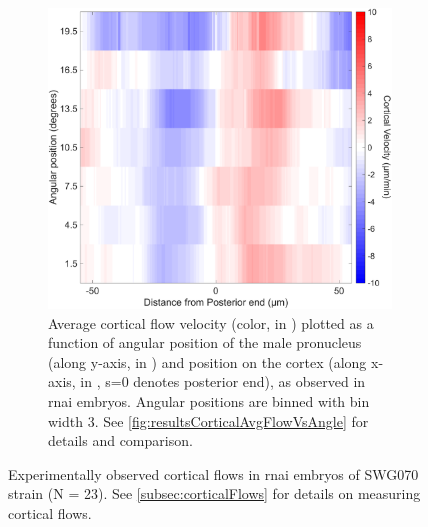 \begin{figure}
\begin{subfigure}[t]{0.3\textwidth}
    \includegraphics[width=\textwidth]{Results/FigExpAir1/crtxFlowAngle.pdf}
    \caption{Average cortical flow velocity (color, in \si{\unitCrtxVel}) plotted as a function of angular position of the male pronucleus (along y-axis, in \si{\unitAngle}) and position on the cortex (along x-axis, in \si{\unitLength}, s=\SI{0}{\unitLength} denotes posterior end), as observed in  \ac{rnai} embryos. Angular positions are binned with bin width \SI{3}{\unitAngle}. See \autoref{fig:resultsCorticalAvgFlowVsAngle} for details and comparison.} 
    \label{subfig:swg070Air1CrtxFlow-VsAngle}
\end{subfigure}
\caption[Experimentally observed cortical flows in  \acs{rnai} embryos]{Experimentally observed cortical flows in  \ac{rnai} embryos of SWG070 strain (N = 23). See \autoref{subsec:corticalFlows} for details on measuring cortical flows.}
\label{fig:swg070Air1CrtxFlow}
\end{figure}

